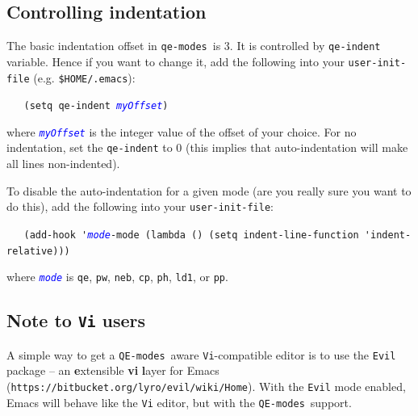 \documentclass[12pt,a4paper]{article}
\def\QEmodes{\texttt{QE-modes}}
\def\qemodes{\texttt{qe-modes}}
\def\var#1{\textcolor{Blue}{\texttt{\textit{#1}}}}
\begin{document}
\subsection{Controlling indentation}

The basic indentation offset in \qemodes\ is 3. It is controlled by
\texttt{qe-indent} variable. Hence if you want to change it, add the
following into your \texttt{user-init-file}
(e.g. \texttt{\$HOME/.emacs}):
\begin{flushleft}
\verb+   (setq qe-indent +\var{myOffset}\verb+)+
\end{flushleft}
where \var{myOffset} is the integer value of the offset of your
choice. For no indentation, set the \texttt{qe-indent} to 0 (this
implies that auto-indentation will make all lines non-indented).

To disable the auto-indentation for a given mode (are you really sure
you want to do this), add the following into your
\texttt{user-init-file}:

{\small
\begin{flushleft}
\verb+   (add-hook '+\var{mode}\verb+-mode (lambda () (setq indent-line-function 'indent-relative)))+
\end{flushleft}
}

\noindent where \var{mode} is \texttt{qe}, \texttt{pw}, \texttt{neb}, \texttt{cp},
\texttt{ph}, \texttt{ld1}, or \texttt{pp}.

\subsection{Note to \texttt{Vi} users}

A simple way to get a \QEmodes\ aware \texttt{Vi}-compatible editor is
to use the \texttt{Evil} package -- an \textbf{e}xtensible \textbf{vi}
\textbf{l}ayer for Emacs
(\texttt{https://bitbucket.org/lyro/evil/wiki/Home}). With the
\texttt{Evil} mode enabled, Emacs will behave like the \texttt{Vi}
editor, but with the \QEmodes\ support.
\end{document}
